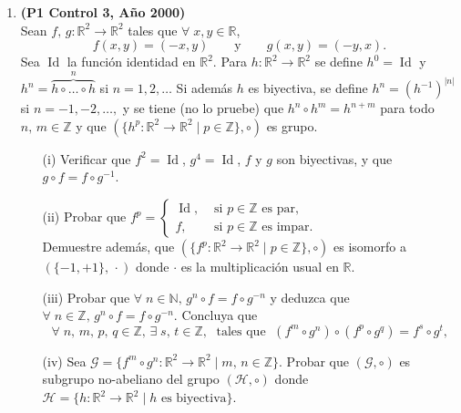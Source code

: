 \documentclass[11pt]{article}
\newcommand{\cur}[1]{\mathcal{#1}}
\newcommand{\R}{\mathbb R}
\newcommand{\N}{\mathbb N}
\newcommand{\Z}{\mathbb Z}
\theoremstyle{plain}
\theoremstyle{definition}
\newcommand{\id}{\operatorname{Id}} %
\begin{document}
\begin{enumerate}
\item \textbf{(P1 Control 3, Año 2000)}\\
Sean $f,\,g:\R^2\longrightarrow\R^2$ tales que $\forall\;x,y\in\R$, 
$$f(x,y)=(-x,y) \qquad \mbox{y} \qquad g(x,y)=(-y,x).$$
Sea $\id$ la función identidad en $\R^2$. Para $h: \R^2\longrightarrow\R^2$ se define $h^0=\id$ y $h^n=\overbrace{h\circ \ldots\circ h}^{n}$ si $n=1,2,\ldots$ Si además $h$ es biyectiva, se define $h^{n}=(h^{-1})^{|n|}$ si $n=-1,-2,\ldots,$ y se tiene (no lo pruebe) que $h^n\circ h^m=h^{n+m}$  para todo $n,\,m\in\Z$ y que $(\{h^{p}: \R^2\longrightarrow \R^2\;|\; p\in\Z\},\circ)$ es grupo.
\begin{enumerate}
\item[(i)] Verificar que $f^2=\id$, $g^4=\id$, $f$ y $g$ son biyectivas, y que $g\circ f=f\circ g^{-1}$.
\item[(ii)] Probar que $f^p=\left\{ \begin{array}{ll}
\id, & \mbox{ si $p\in\Z$ es par,}\\
f, & \mbox{ si $p\in\Z$ es impar.}
\end{array}\right.$\\
Demuestre además, que $(\{f^p: \R^2\longrightarrow \R^2\;|\; p\in\Z\},\circ)$ es isomorfo a $(\{-1,+1\},\,\cdot)$ donde $\cdot$ es la multiplicación usual en $\R$.
\item[(iii)] Probar que $\forall\;n\in\N, \, g^n\circ f=f\circ g^{-n}$ y deduzca que $\forall\;n\in\Z,\,g^n\circ f=f\circ g^{-n}.$ Concluya que
$$\forall\;n,\,m,\,p,\,q\in\Z,\,\exists\;s,\,t\in\Z,\;\mbox{ tales que }\; (f^{m}\circ g^{n})\circ (f^{p}\circ g^{q})=f^s\circ g^t,$$
\item[(iv)] Sea $\cur{G}=\{f^m\circ g^n: \R^2\longrightarrow\R^2\;|\;m,\,n\in\Z\}$. Probar que $(\cur{G},\circ)$ es subgrupo no-abeliano del grupo $(\cur{H},\circ)$ donde $\cur{H}=\{h: \R^2\longrightarrow\R^2\;|\; h \mbox{ es biyectiva}\}$.
\end{enumerate}


\end{enumerate}
\end{document}
